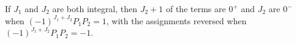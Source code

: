 If $J_1$ and $J_2$ are both integral, then $J_2+1$ of the terms are $0^+$ and $J_2$ are $0^-$ when $(-1)^{J_1+J_2}P_1P_2=1$, with the assignments reversed when $(-1)^{J_1+J_2}P_1P_2=-1$.

